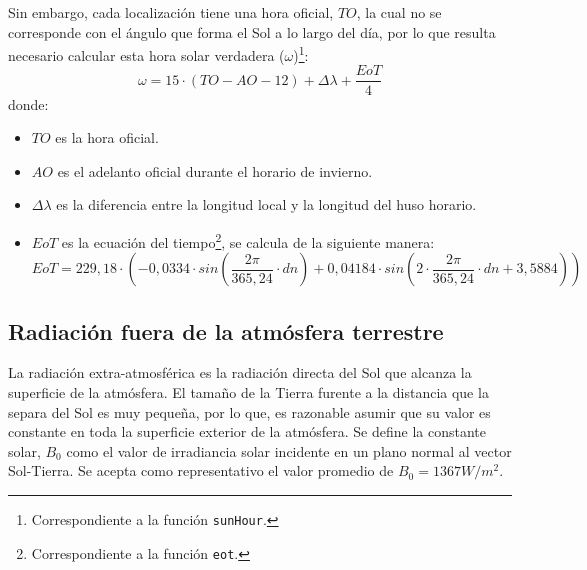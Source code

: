 Sin embargo, cada localización tiene una hora oficial, \(TO\), la cual no se corresponde con el ángulo que forma el Sol a lo largo del día, por lo que resulta necesario calcular esta hora solar verdadera (\(\omega\))\footnote{Correspondiente a la función \texttt{sunHour}.}:  
\begin{equation}
\omega = 15 \cdot (TO-AO-12)+\Delta \lambda + \frac{EoT}{4}
\end{equation}
donde:
\begin{itemize}
\item \(TO\) es la hora oficial.
\item \(AO\) es el adelanto oficial durante el horario de invierno. 
\item \(\Delta \lambda\) es la diferencia entre la longitud local y la longitud del huso horario. 
\item \(EoT\) es la ecuación del tiempo\footnote{Correspondiente a la función \texttt{eot}.}, se calcula de la siguiente manera: 
\begin{equation}
EoT=229,18\cdot (-0,0334\cdot sin(\frac{2\pi}{365,24}\cdot dn)+0,04184\cdot sin(2\cdot \frac{2\pi}{365,24}\cdot dn+3,5884))
\end{equation}
\end{itemize}

\subsection{Radiación fuera de la atmósfera terrestre}
\label{sec:orga01ef28}
La radiación extra-atmosférica es la radiación directa del Sol que alcanza la superficie de la atmósfera. El tamaño de la Tierra furente a la distancia que la separa del Sol es muy pequeña, por lo que, es razonable asumir que su valor es constante en toda la superficie exterior de la atmósfera. Se define la constante solar, \(B_0\) como el valor de irradiancia solar incidente en un plano normal al vector Sol-Tierra. Se acepta como representativo el valor promedio de \(B_0=1367W/m^2\).

